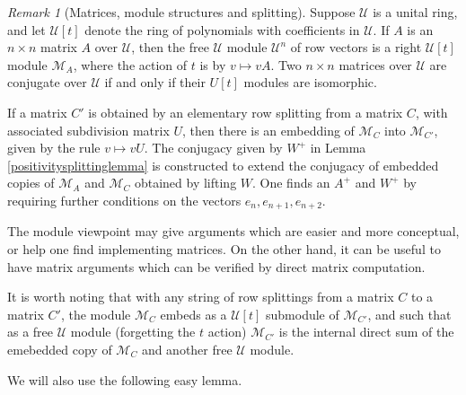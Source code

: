 \documentclass{amsart}
\theoremstyle{definition}
\theoremstyle{remark}
\newtheorem{remark}[theorem]{Remark}
\numberwithin{equation}{section}
\begin{document}
{{\begin{remark}[Matrices, module structures and splitting]
Suppose $\mathcal U$ is a  unital ring, and 
let $\mathcal U[t]$ denote the ring of polynomials with coefficients in 
$\mathcal U$. 
If $A$ is an  $n\times n$ matrix $A$ over $\mathcal U$, 
then the free $\mathcal U$ module $\mathcal U^n$ of row vectors 
is a right $\mathcal U[t]$ module $\mathcal M_A$, where the action 
of $t$ is by $v\mapsto vA$. 
Two $n\times n$ matrices over $\mathcal U$ 
are conjugate 
over $\mathcal U$ if and only if their $U[t]$ modules are
isomorphic. 

If a matrix $C'$ is obtained by an elementary row splitting from a 
matrix $C$, with associated subdivision matrix $U$, 
then there is an embedding of 
$\mathcal M_C$ into 
$\mathcal M_{C'}$, given by the rule $v\mapsto vU$. 
The conjugacy given by $W^{+}$ in Lemma \ref{positivitysplittinglemma} 
is constructed to 
extend the conjugacy of embedded copies of $\mathcal M_A$ and 
$\mathcal M_C$ obtained by lifting $W$. 
One finds an $A^+$ and $W^+$ by requiring further conditions 
on the vectors $e_n, e_{n+1}, e_{n+2}$. 

The module viewpoint 
may give 
arguments which are easier and more conceptual, 
or help one find implementing matrices.  
On the other hand, 
it can be useful
to have  matrix arguments  
which can be verified by direct matrix computation.  


It is worth noting that with any string of row splittings from a 
matrix $C$ to a matrix $C'$, the module 
$\mathcal M_C$ embeds as a $\mathcal U[t]$ submodule of 
$\mathcal M_{C'}$, and such that as a free $\mathcal U$ module (forgetting 
the $t$ action) $\mathcal M_{C'}$ is the internal direct sum 
of the emebedded copy of $\mathcal M_C$ and another free $\mathcal U$ module. 

\end{remark} 




We will also use the following easy  lemma. 

}}
\end{document}
